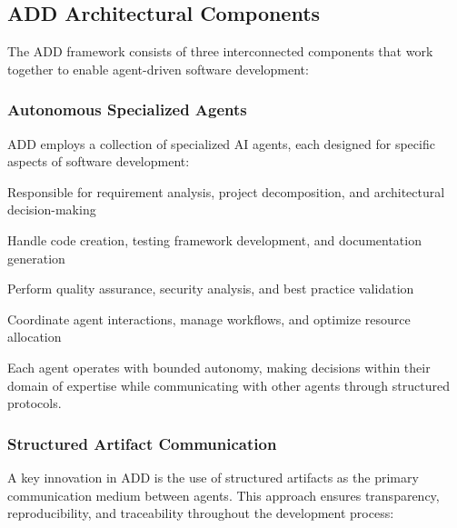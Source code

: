 \subsection{ADD Architectural Components}

The ADD framework consists of three interconnected components that work together to enable agent-driven software development:

\subsubsection{Autonomous Specialized Agents}

ADD employs a collection of specialized AI agents, each designed for specific aspects of software development:

\begin{description}[leftmargin=3cm,labelwidth=2.5cm]
    \item[\textbf{Planning Agents}] Responsible for requirement analysis, project decomposition, and architectural decision-making
    \item[\textbf{Generation Agents}] Handle code creation, testing framework development, and documentation generation
    \item[\textbf{Review Agents}] Perform quality assurance, security analysis, and best practice validation
    \item[\textbf{Orchestration Agents}] Coordinate agent interactions, manage workflows, and optimize resource allocation
\end{description}

Each agent operates with bounded autonomy, making decisions within their domain of expertise while communicating with other agents through structured protocols.

\subsubsection{Structured Artifact Communication}

A key innovation in ADD is the use of structured artifacts as the primary communication medium between agents. This approach ensures transparency, reproducibility, and traceability throughout the development process:

